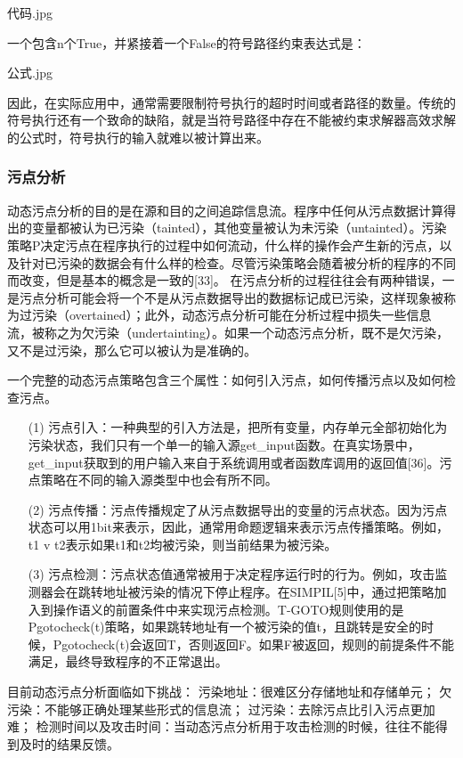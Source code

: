 \documentclass[doctor,privacy,twoside]{buaa_mac}
\begin{document}
代码.jpg

一个包含n个True，并紧接着一个False的符号路径约束表达式是：

公式.jpg

因此，在实际应用中，通常需要限制符号执行的超时时间或者路径的数量。传统的符号执行还有一个致命的缺陷，就是当符号路径中存在不能被约束求解器高效求解的公式时，符号执行的输入就难以被计算出来。

\subsubsection{污点分析}

动态污点分析的目的是在源和目的之间追踪信息流。程序中任何从污点数据计算得出的变量都被认为已污染（tainted），其他变量被认为未污染（untainted）。污染策略P决定污点在程序执行的过程中如何流动，什么样的操作会产生新的污点，以及针对已污染的数据会有什么样的检查。尽管污染策略会随着被分析的程序的不同而改变，但是基本的概念是一致的[33]。
在污点分析的过程往往会有两种错误，一是污点分析可能会将一个不是从污点数据导出的数据标记成已污染，这样现象被称为过污染（overtained）；此外，动态污点分析可能在分析过程中损失一些信息流，被称之为欠污染（undertainting）。如果一个动态污点分析，既不是欠污染，又不是过污染，那么它可以被认为是准确的。

一个完整的动态污点策略包含三个属性：如何引入污点，如何传播污点以及如何检查污点。
\begin{itemize}
\item[(1)] 污点引入：一种典型的引入方法是，把所有变量，内存单元全部初始化为污染状态，我们只有一个单一的输入源get\_{}input函数。在真实场景中，get\_{}input获取到的用户输入来自于系统调用或者函数库调用的返回值[36]。污点策略在不同的输入源类型中也会有所不同。
\item[(2)] 污点传播：污点传播规定了从污点数据导出的变量的污点状态。因为污点状态可以用1bit来表示，因此，通常用命题逻辑来表示污点传播策略。例如，t1 v t2表示如果t1和t2均被污染，则当前结果为被污染。
\item[(3)] 污点检测：污点状态值通常被用于决定程序运行时的行为。例如，攻击监测器会在跳转地址被污染的情况下停止程序。在SIMPIL[5]中，通过把策略加入到操作语义的前置条件中来实现污点检测。T-GOTO规则使用的是Pgotocheck(t)策略，如果跳转地址有一个被污染的值t，且跳转是安全的时候，Pgotocheck(t)会返回T，否则返回F。如果F被返回，规则的前提条件不能满足，最终导致程序的不正常退出。
\end{itemize}

目前动态污点分析面临如下挑战：
污染地址：很难区分存储地址和存储单元；
欠污染：不能够正确处理某些形式的信息流；
过污染：去除污点比引入污点更加难；
检测时间以及攻击时间：当动态污点分析用于攻击检测的时候，往往不能得到及时的结果反馈。
\end{document}
